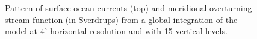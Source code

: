 \begin{figure}
\caption{Pattern of surface ocean currents (top) and meridional
overturning stream function (in Sverdrups) from a global
integration of the model at $4^{\circ}$ horizontal resolution and with
15 vertical levels.}
\label{fig:large-scale-circ}
\end{figure}
